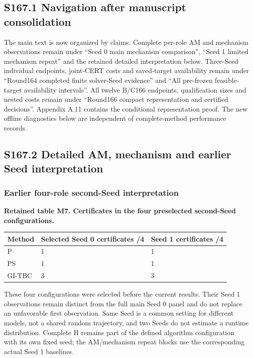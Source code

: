\documentclass[
  american,
  11pt,
]{article}
\newcounter{none} %
\begin{document}
\subsection{S167.1 Navigation after manuscript
consolidation}\label{s167.1-navigation-after-manuscript-consolidation}

The main text is now organized by claims. Complete per-role AM and
mechanism observations remain under ``Seed 0 main mechanism
comparison'', ``Seed 1 limited mechanism repeat'' and the retained
detailed interpretation below. Three-Seed individual endpoints,
joint-CERT costs and saved-target availability remain under ``Round164
completed finite solver-Seed evidence'' and ``All pre-frozen
feasible-target availability intervals''. All twelve B/C166 endpoints,
qualification sizes and nested costs remain under ``Round166 compact
representation and certified decisions''. Appendix A.11 contains the
conditional representation proof. The new offline diagnostics below are
independent of complete-method performance records.

\Needspace{160pt}

\subsection{S167.2 Detailed AM, mechanism and earlier Seed
interpretation}\label{s167.2-detailed-am-mechanism-and-earlier-seed-interpretation}

\subsubsection{Earlier four-role second-Seed
interpretation}\label{earlier-four-role-second-seed-interpretation}

\textbf{Retained table M7. Certificates in the four preselected
second-Seed configurations.}

{\def\LTcaptype{none} %
\begin{longtable}[]{@{}lll@{}}
\toprule\noalign{}
Method & Selected Seed 0 certificates /4 & Seed 1 certificates /4 \\
\midrule\noalign{}
\endhead
\bottomrule\noalign{}
\endlastfoot
P & 1 & 1 \\
PS & 1 & 1 \\
GI-TBC & 3 & 3 \\
\end{longtable}
}

These four configurations were selected before the current results.
Their Seed 1 observations remain distinct from the full main Seed 0
panel and do not replace an unfavorable first observation. Same Seed is
a common setting for different models, not a shared random trajectory,
and two Seeds do not estimate a runtime distribution. Complete H remains
part of the defined algorithm configuration with its own fixed seed; the
AM/mechanism repeat blocks use the corresponding actual Seed 1
baselines.
\end{document}

